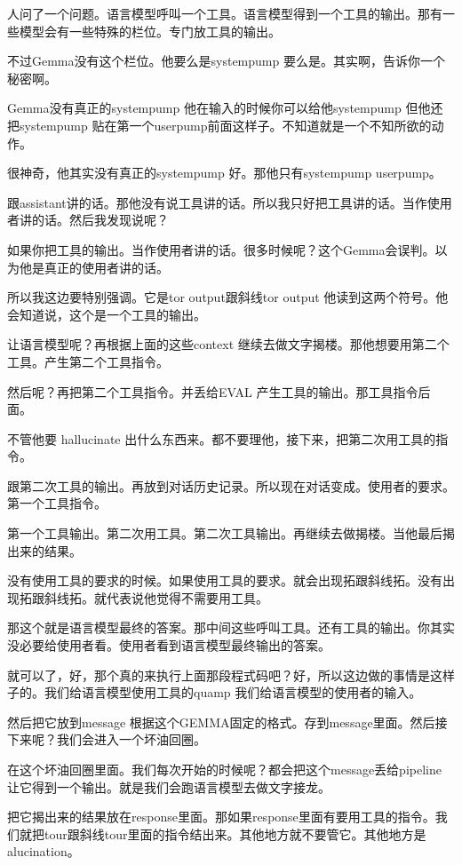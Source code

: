 \documentclass[12pt,a4paper]{article}
\begin{document}
人问了一个问题。语言模型呼叫一个工具。语言模型得到一个工具的输出。那有一些模型会有一些特殊的栏位。专门放工具的输出。

不过Gemma没有这个栏位。他要么是systempump 要么是。其实啊，告诉你一个秘密啊。

Gemma没有真正的systempump 他在输入的时候你可以给他systempump 但他还把systempump 贴在第一个userpump前面这样子。不知道就是一个不知所欲的动作。

很神奇，他其实没有真正的systempump 好。那他只有systempump userpump。

跟assistant讲的话。那他没有说工具讲的话。所以我只好把工具讲的话。当作使用者讲的话。然后我发现说呢？

如果你把工具的输出。当作使用者讲的话。很多时候呢？这个Gemma会误判。以为他是真正的使用者讲的话。

所以我这边要特别强调。它是tor output跟斜线tor output 他读到这两个符号。他会知道说，这个是一个工具的输出。

让语言模型呢？再根据上面的这些context 继续去做文字揭楼。那他想要用第二个工具。产生第二个工具指令。

然后呢？再把第二个工具指令。并丢给EVAL 产生工具的输出。那工具指令后面。

不管他要 hallucinate 出什么东西来。都不要理他，接下来，把第二次用工具的指令。

跟第二次工具的输出。再放到对话历史记录。所以现在对话变成。使用者的要求。第一个工具指令。

第一个工具输出。第二次用工具。第二次工具输出。再继续去做揭楼。当他最后揭出来的结果。

没有使用工具的要求的时候。如果使用工具的要求。就会出现拓跟斜线拓。没有出现拓跟斜线拓。就代表说他觉得不需要用工具。

那这个就是语言模型最终的答案。那中间这些呼叫工具。还有工具的输出。你其实没必要给使用者看。使用者看到语言模型最终输出的答案。

就可以了，好，那个真的来执行上面那段程式码吧？好，所以这边做的事情是这样子的。我们给语言模型使用工具的quamp 我们给语言模型的使用者的输入。

然后把它放到message 根据这个GEMMA固定的格式。存到message里面。然后接下来呢？我们会进入一个坏油回圈。

在这个坏油回圈里面。我们每次开始的时候呢？都会把这个message丢给pipeline 让它得到一个输出。就是我们会跑语言模型去做文字接龙。

把它揭出来的结果放在response里面。那如果response里面有要用工具的指令。我们就把tour跟斜线tour里面的指令结出来。其他地方就不要管它。其他地方是alucination。
\end{document}
